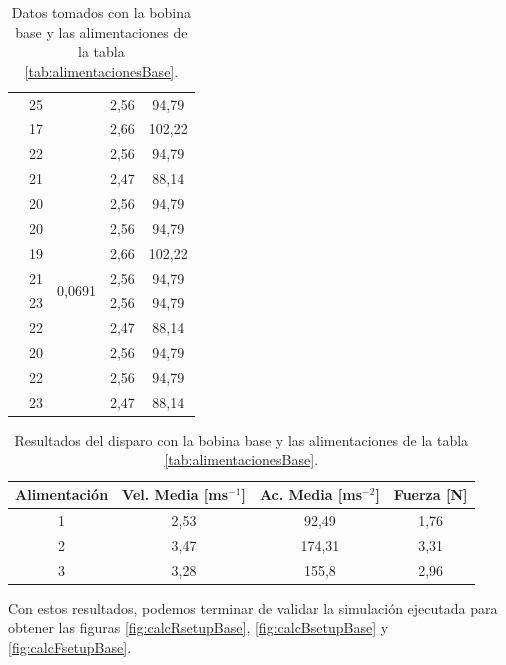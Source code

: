 \begin{table}[H]
\begin{tabular}{|c|c|c|c|c|}
                        & 25     &                          & 2,56      & 94,79       \\
                        & 17     &                          & 2,66      & 102,22      \\
                        & 22     &                          & 2,56      & 94,79       \\
    \hdashline[2pt/5pt]
    \multirow{10}{*}{3} & 21     & \multirow{10}{*}{0,0691} & 2,47      & 88,14       \\
                        & 20     &                          & 2,56      & 94,79       \\
                        & 20     &                          & 2,56      & 94,79       \\
                        & 19     &                          & 2,66      & 102,22      \\
                        & 21     &                          & 2,56      & 94,79       \\
                        & 23     &                          & 2,56      & 94,79       \\
                        & 22     &                          & 2,47      & 88,14       \\
                        & 20     &                          & 2,56      & 94,79       \\
                        & 22     &                          & 2,56      & 94,79       \\
                        & 23     &                          & 2,47      & 88,14       \\
    \hline
    \end{tabular}
    \caption{Datos tomados con la bobina base y las alimentaciones de la tabla \ref{tab:alimentacionesBase}.}
    \label{tab:datosBase}
\end{table}

\begin{table}[H]
    \centering
    \setlength{\tabcolsep}{5pt}
    \renewcommand{\arraystretch}{1.2}
    \begin{tabular}{|c|c|c|c|}
        \hline
        \textbf{Alimentación} & \textbf{Vel. Media [ms\(^{-1}\)]} & \textbf{Ac. Media [ms\(^{-2}\)]} & \textbf{Fuerza [N]} \\
        \hline
        1 & 2,53 & 92,49 & 1,76 \\
        2 & 3,47 & 174,31 & 3,31 \\
        3 & 3,28 & 155,8 & 2,96 \\
        \hline
    \end{tabular}
    \caption{Resultados del disparo con la bobina base y las alimentaciones de la tabla \ref{tab:alimentacionesBase}.}
    \label{tab:resultadosBase}
\end{table}
\restoregeometry

Con estos resultados, podemos terminar de validar la simulación ejecutada para obtener las figuras \ref{fig:calcRsetupBase}, \ref{fig:calcBsetupBase} y \ref{fig:calcFsetupBase}.